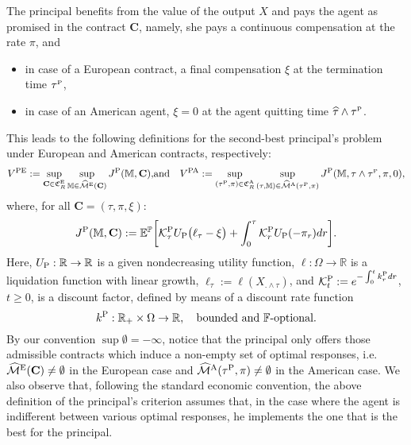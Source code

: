 \documentclass[11pt,a4paper]{article}
\numberwithin{equation}{section}
\def\dbE{\mathbb{E}}
\def\dbF{\mathbb{F}}
\def\dbM{\mathbb{M}}
\def\dbP{\mathbb{P}}
\def\dbR{\mathbb{R}}
\newcommand{\cK}{\mathcal{K}}
\newcommand{\cM}{\mathcal{M}}
\newcommand{\Cbf}{\mathbf{C}}
\def\no{\noindent}
\newcommand{\beaa}{\begin{eqnarray*}}
\newcommand{\eeaa}{\end{eqnarray*}}
\theoremstyle{definition}
\begin{document}
The principal benefits from the value of the output $X$ and pays the agent as promised in the contract $\Cbf$, namely, she pays a continuous compensation at the rate $\pi$, and 
\begin{itemize}
 \item in case of a European contract, a final compensation $\xi$ at the termination time $\tau^{\scriptscriptstyle\rm P}$,
 \item in case of an American agent, $\xi=0$ at the agent quitting time $\widehat\tau\wedge\tau^{\scriptscriptstyle\rm P}$. 
\end{itemize}

\no This leads to the following definitions for the second-best principal's problem under European and American contracts, respectively:
 \beaa
  V^{\rm PE} 
  := 
  \sup_{\Cbf\in\mathfrak{C}^{\rm E}_R} 
  \sup_{\dbM\in\widehat{\cM}^{\rm E}(\Cbf)}
  J^{\rm P}(\dbM,\Cbf), 
  &\mbox{and}&
  V^{\rm PA} 
  := 
  \sup_{(\tau^{\scriptscriptstyle\rm P},\pi)\in\mathfrak{C}^{\rm A}_R} 
  \sup_{(\tau,\dbM)\in\widehat{\cM}^{\rm A}(\tau^{\scriptscriptstyle\rm P},\pi)}
  J^{\rm P}(\dbM,\tau\wedge\tau^{\scriptscriptstyle\rm P},\pi,0),
  \eeaa
where, for all $\Cbf=(\tau,\pi,\xi)$:
  \beaa 
  J^{\rm P}(\dbM,\Cbf) 
   :=
  \dbE^{\dbP}\bigg[\cK^{\rm P}_\tau U_{\rm P}\big(\ell_\tau-\xi\big) + \int_0^\tau \cK^{\rm P}_rU_{\rm P}(-\pi_r)dr\bigg].
 \eeaa
Here, $U_{\rm P}:\dbR\rightarrow \dbR$ is a given nondecreasing utility function, $\ell:\Omega\rightarrow \dbR$ is a liquidation function with linear growth, $\ell_\tau:=\ell(X_{.\wedge\tau})$, and $\cK^{\rm P}_t:=e^{-\int_0^t k^{\rm P}_rdr}$, $t\geq 0$, is a discount factor, defined by means of a discount rate function 
   $$ k^{\rm P}:\dbR_+\times\Omega\rightarrow \dbR,~~\mbox{ bounded and $\dbF$-optional}. $$
By our convention $\sup\emptyset=-\infty$, notice that the principal only offers those admissible contracts which induce a non-empty set of optimal responses, i.e. $\widehat{\cM}^{\rm E}(\Cbf)\neq\emptyset$ in the European case and $\widehat{\cM}^{\rm A}(\tau^{\rm P},\pi)\neq\emptyset$ in the American case. We also observe that, following the standard economic convention, the above definition of the principal's criterion assumes that, in the case where the agent is indifferent between various optimal responses, he implements the one that is the best for the principal. 
  
\end{document}
